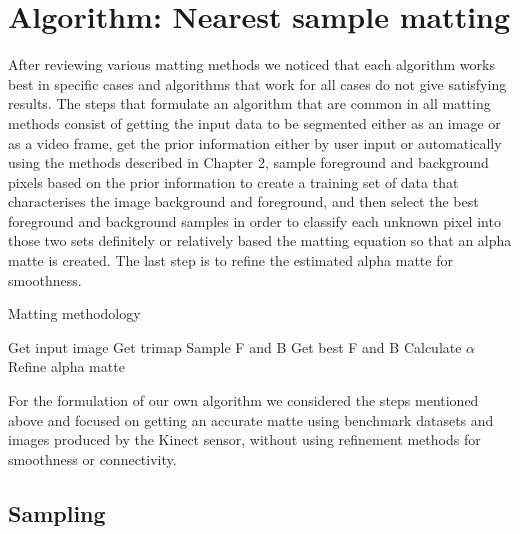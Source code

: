 \chapter{Algorithm: Nearest sample matting}
\label{chap:nearest-sample-matting}


After reviewing various matting methods we noticed that each algorithm works best in specific cases and algorithms that work for all cases do not give satisfying results. The steps that formulate an algorithm that are common in all matting methods consist of getting the input data to be segmented either as an image or as a video frame, get the prior information either by user input or automatically using the methods described in Chapter 2, sample foreground and background pixels based on the prior information to create a training set of data that characterises the image background and foreground, and then select the best foreground and background samples in order to classify each unknown pixel into those two sets definitely or relatively based the matting equation so that an alpha matte is created. The last step is to refine the estimated alpha matte for smoothness. 

\begin{algorithm}
\caption{Matting methodology}\label{matting-method}
\begin{algorithmic}[1]
\State Get input image
\State Get trimap
\State Sample F and B
\State Get best F and B
\State Calculate $\alpha$
\EndFor
\State Refine alpha matte
\end{algorithmic}
\end{algorithm}

For the formulation of our own algorithm we considered the steps mentioned above and focused on getting an accurate matte using benchmark datasets and images produced by the Kinect sensor, without using refinement methods for smoothness or connectivity.

\section{Sampling}
\label{sec:sampling}

